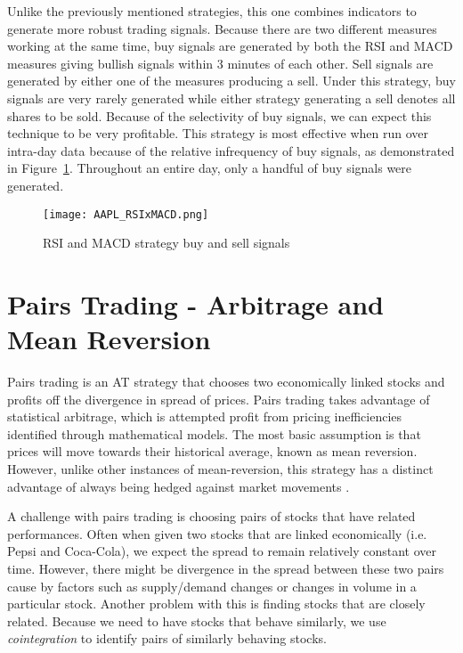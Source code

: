 \documentclass[../thesis.tex]{subfiles}
\begin{document}
Unlike the previously mentioned strategies, this one combines indicators to generate more robust trading signals. Because there are two different measures working at the same time, buy signals are generated by both the RSI and MACD measures giving bullish signals within 3 minutes of each other. Sell signals are generated by either one of the measures producing a sell. Under this strategy, buy signals are very rarely generated while either strategy generating a sell denotes all shares to be sold. Because of the selectivity of buy signals, we can expect this technique to be very profitable. This strategy is most effective when run over intra-day data because of the relative infrequency of buy signals, as demonstrated in Figure~\ref{RSIMACDfigure}. Throughout an entire day, only a handful of buy signals were generated. 

\begin{figure}[h]
\centering
\texttt{[image: AAPL\_RSIxMACD.png]}
\caption{RSI and MACD strategy buy and sell signals \label{overflow}}
\label{RSIMACDfigure}
\end{figure}

\section{Pairs Trading - Arbitrage and Mean Reversion}

Pairs trading is an AT strategy that chooses two economically linked stocks and profits off the divergence in spread of prices. Pairs trading takes advantage of statistical arbitrage, which is attempted profit from pricing inefficiencies identified through mathematical models. The most basic assumption is that prices will move towards their historical average, known as mean reversion. However, unlike other instances of mean-reversion, this strategy has a distinct advantage of always being hedged against market movements \cite{Fu2009}. 

A challenge with pairs trading is choosing pairs of stocks that have related performances. Often when given two stocks that are linked economically (i.e. Pepsi and Coca-Cola), we expect the spread to remain relatively constant over time. However, there might be divergence in the spread between these two pairs cause by factors such as supply/demand changes or changes in volume in a particular stock.  Another problem with this is finding stocks that are closely related. Because we need to have stocks that behave similarly, we use \textit{cointegration} to identify pairs of similarly behaving stocks. 
\end{document}
